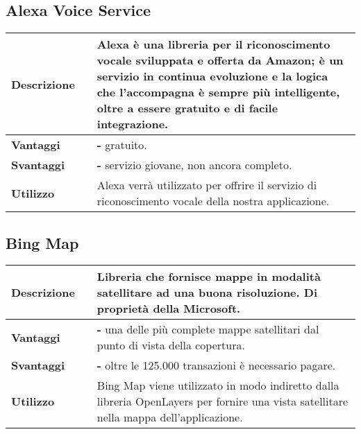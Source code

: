 \subsection{Alexa Voice Service}
\label{Alexa Voice Service}
\begin{table}[H]
	\centering
	\begin{tabular}{p{2cm}p{0.5cm}p{11.5cm}}
	\arrayrulecolor{lightgray}
	\toprule
	\textbf{Descrizione} & &
		Alexa è una libreria per il riconoscimento vocale sviluppata e offerta da Amazon; è un servizio in continua evoluzione e la logica che l'accompagna è sempre più intelligente, oltre a essere gratuito e di facile integrazione.
	\\ \midrule
	\textbf{Vantaggi} & &
		\textbf{- }gratuito.
	\\ \midrule
	\textbf{Svantaggi} & &
		\textbf{- }servizio giovane, non ancora completo.
	\\ \midrule
	\textbf{Utilizzo} & &
		Alexa verrà utilizzato per offrire il servizio di riconoscimento vocale della nostra applicazione.
	\\ \bottomrule
	\end{tabular}
\end{table}


\vspace{40px}
\subsection{Bing Map}
\label{Bing Map}
\begin{table}[H]
	\centering
	\begin{tabular}{p{2cm}p{0.5cm}p{11.5cm}}
		\arrayrulecolor{lightgray}
		\toprule
		\textbf{Descrizione} & &
		Libreria che fornisce mappe in modalità satellitare ad una buona risoluzione. Di proprietà della Microsoft.
		\\ \midrule
		\textbf{Vantaggi} & &
		\textbf{- }una delle più complete mappe satellitari dal punto di vista della copertura.
		\\ \midrule
		\textbf{Svantaggi} & &
		\textbf{- }oltre le 125.000 transazioni è necessario pagare.
		\\ \midrule
		\textbf{Utilizzo} & &
		Bing Map viene utilizzato in modo indiretto dalla libreria OpenLayers per fornire una vista satellitare nella mappa dell'applicazione.
		\\ \bottomrule
	\end{tabular}
\end{table}


\vspace{40px}
